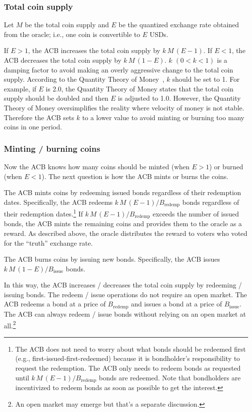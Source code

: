 \documentclass[dvipdfmx,a4paper]{article}
\begin{document}
\subsubsection{Total coin supply}

Let $M$ be the total coin supply and $E$ be the quantized exchange rate obtained from the oracle; i.e., one coin is convertible to $E$ USDs.

If $E>1$, the ACB increases the total coin supply by $k\,M\,(E-1)$. If $E<1$, the ACB decreases the total coin supply by $k\,M\,(1-E)$. $k$ $(0<k<1)$ is a damping factor to avoid making an overly aggressive change to the total coin supply. According to the Quantity Theory of Money~\cite{mankiwmacro}, $k$ should be set to 1. For example, if $E$ is 2.0, the Quantity Theory of Money states that the total coin supply should be doubled and then $E$ is adjusted to 1.0. However, the Quantity Theory of Money oversimplifies the reality where velocity of money is not stable. Therefore the ACB sets $k$ to a lower value to avoid minting or burning too many coins in one period.

\subsubsection{Minting / burning coins}

Now the ACB knows how many coins should be minted (when $E>1$) or burned (when $E<1$). The next question is how the ACB mints or burns the coins.

The ACB mints coins by redeeming issued bonds regardless of their redemption dates. Specifically, the ACB redeems $k\,M\,(E-1)/B_{\mathrm{redemp}}$ bonds regardless of their redemption dates.\footnote{The ACB does not need to worry about what bonds should be redeemed first (e.g., first-issued-first-redeemed) because it is bondholder's responsibility to request the redemption. The ACB only needs to redeem bonds as requested until $k\,M\,(E-1)/B_{\mathrm{redemp}}$ bonds are redeemed. Note that bondholders are incentivized to redeem bonds as soon as possible to get the interest.} If $k\,M\,(E-1)/B_{\mathrm{redemp}}$ exceeds the number of issued bonds, the ACB mints the remaining coins and provides them to the oracle as a reward. As described above, the oracle distributes the reward to voters who voted for the ``truth'' exchange rate.

The ACB burns coins by issuing new bonds. Specifically, the ACB issues $k\,M\,(1-E)/B_{\mathrm{issue}}$ bonds.

In this way, the ACB increases / decreases the total coin supply by redeeming / issuing bonds. The redeem / issue operations do not require an open market. The ACB redeems a bond at a price of $B_{\mathrm{redemp}}$ and issues a bond at a price of $B_{\mathrm{issue}}$. The ACB can always redeem / issue bonds without relying on an open market at all.\footnote{An open market may emerge but that's a separate discussion.}
\end{document}
